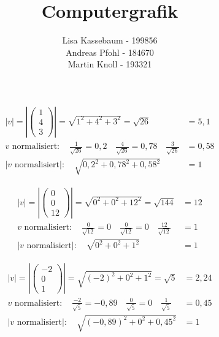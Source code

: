 \documentclass[a4paper]{article}
\title{Computergrafik}
\author{Lisa Kassebaum - 199856 \\ Andreas Pfohl - 184670 \\ Martin Knoll - 193321 }
\date{}
\begin{document}
\maketitle
\section{}
\subsection{}
  \begin{align*}
    \left|v\right|
    =
    \left|
    \begin{pmatrix}
      1 \\ 4 \\ 3
    \end{pmatrix}
    \right|
    =
    \sqrt{1^2 + 4^2 + 3^2}
    = \sqrt{26} &= 5,1
    \\[1em]
    v\text{ normalisiert}: \quad \frac{1}{\sqrt{26}} = 0,2 \quad \frac{4}{\sqrt{26}} = 0,78 \quad \frac{3}{\sqrt{26}} &= 0,58
    \\[1em]
    \left|v\text{ normalisiert}\right|: \quad \sqrt{0,2^2 + 0,78^2 + 0,58^2} &= 1
  \end{align*}

  \begin{align*}
    \left|v\right|
    =
    \left|
    \begin{pmatrix}
      0 \\ 0 \\ 12
    \end{pmatrix}
    \right|
    =
    \sqrt{0^2 + 0^2 + 12^2}
    = \sqrt{144} &= 12
    \\[1em]
    v\text{ normalisiert}: \quad \frac{0}{\sqrt{12}} = 0 \quad \frac{0}{\sqrt{12}} = 0 \quad \frac{12}{\sqrt{12}} &= 1
    \\[1em]
    \left|v\text{ normalisiert}\right|: \quad \sqrt{0^2 + 0^2 + 1^2} &= 1
  \end{align*}

  \begin{align*}
    \left|v\right|
    =
    \left|
    \begin{pmatrix}
      -2 \\ 0 \\ 1
    \end{pmatrix}
    \right|
    =
    \sqrt{(-2)^2 + 0^2 + 1^2}
    = \sqrt{5} &= 2,24
    \\[1em]
    v\text{ normalisiert}: \quad \frac{-2}{\sqrt{5}} = -0,89 \quad \frac{0}{\sqrt{5}} = 0 \quad \frac{1}{\sqrt{5}} &= 0,45
    \\[1em]
    \left|v\text{ normalisiert}\right|: \quad \sqrt{(-0,89)^2 + 0^2 + 0,45^2} &= 1
  \end{align*}
\end{document}
